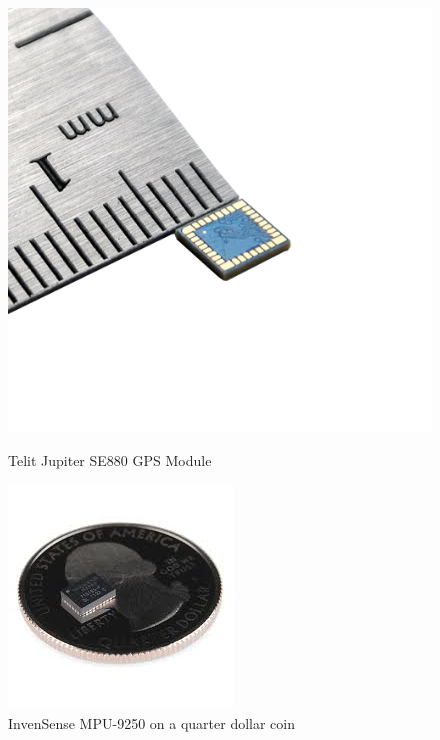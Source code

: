 \begin{figure}
\centering
{}
\includegraphics[width=\textwidth]{Files/Figures/se880.png}
\caption[Telit Jupiter SE880 GPS Module]{Telit Jupiter SE880 GPS Module \cite{telit}}
\label{fig:telit-se880}
\endminipage\hfill
{}
\includegraphics[width=\textwidth]{Files/Figures/mpu-9250.jpg}
\caption[InvenSense MPU-9259]{InvenSense MPU-9250 on a quarter dollar coin \cite{mpu9250}}
\label{fig:mpu9250}
\endminipage\hfill
\end{figure}

